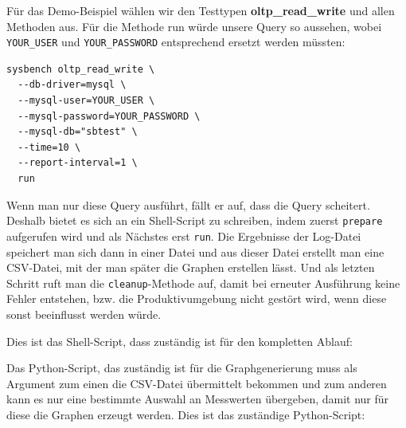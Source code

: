 Für das Demo-Beispiel wählen wir den Testtypen \textbf{oltp\_read\_write} und allen Methoden aus.
Für die Methode run würde unsere Query so aussehen, wobei \texttt{YOUR\_USER} und \texttt{YOUR\_PASSWORD}
entsprechend ersetzt werden müssten:

\begin{lstlisting}[style=custom_daniel,label={lst:sysbenchrun}]
sysbench oltp_read_write \
  --db-driver=mysql \
  --mysql-user=YOUR_USER \
  --mysql-password=YOUR_PASSWORD \
  --mysql-db="sbtest" \
  --time=10 \
  --report-interval=1 \
  run
\end{lstlisting}

Wenn man nur diese Query ausführt, fällt er auf, dass die Query scheitert. Deshalb bietet es sich an ein Shell-Script
zu schreiben, indem zuerst \texttt{prepare} aufgerufen wird und als Nächstes erst \texttt{run}. Die Ergebnisse der Log-Datei
speichert man sich dann in einer Datei und aus dieser Datei erstellt man eine CSV-Datei, mit der man später die Graphen
erstellen lässt. Und als letzten Schritt ruft man die \texttt{cleanup}-Methode auf, damit bei erneuter Ausführung keine
Fehler entstehen, bzw. die Produktivumgebung nicht gestört wird, wenn diese sonst beeinflusst werden würde.

Dies ist das Shell-Script, dass zuständig ist für den kompletten Ablauf:




Das Python-Script, das zuständig ist für die Graphgenerierung muss als Argument zum einen
die CSV-Datei übermittelt bekommen und zum anderen kann es nur eine bestimmte Auswahl an
Messwerten übergeben, damit nur für diese die Graphen erzeugt werden.
Dies ist das zuständige Python-Script:





